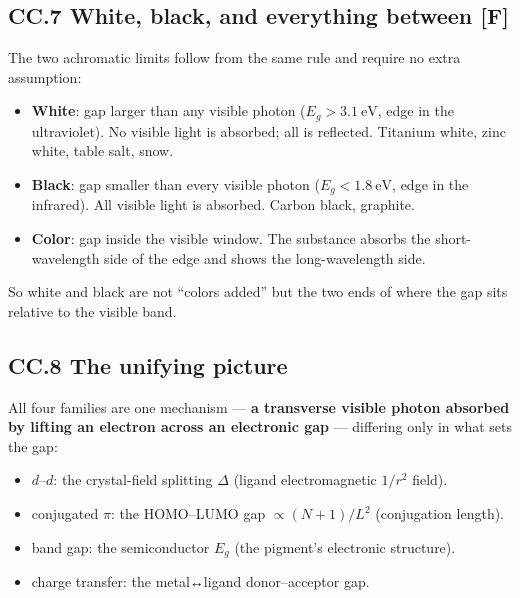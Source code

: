 \documentclass[
  10pt,
]{article}
\providecommand{\tightlist}{%
  \setlength{\itemsep}{0pt}\setlength{\parskip}{0pt}}
\begin{document}
\hypertarget{cc.7-white-black-and-everything-between-f}{%
\subsection{\texorpdfstring{CC.7 White, black, and everything between
\textbf{{[}F{]}}}{CC.7 White, black, and everything between {[}F{]}}}\label{cc.7-white-black-and-everything-between-f}}

The two achromatic limits follow from the same rule and require no extra
assumption:

\begin{itemize}
\tightlist
\item
  \textbf{White}: gap larger than any visible photon
  (\(E_g > 3.1\ \mathrm{eV}\), edge in the ultraviolet). No visible
  light is absorbed; all is reflected. Titanium white, zinc white, table
  salt, snow.
\item
  \textbf{Black}: gap smaller than every visible photon
  (\(E_g < 1.8\ \mathrm{eV}\), edge in the infrared). All visible light
  is absorbed. Carbon black, graphite.
\item
  \textbf{Color}: gap inside the visible window. The substance absorbs
  the short-wavelength side of the edge and shows the long-wavelength
  side.
\end{itemize}

So white and black are not ``colors added'' but the two ends of where
the gap sits relative to the visible band.

\hypertarget{cc.8-the-unifying-picture}{%
\subsection{CC.8 The unifying picture}\label{cc.8-the-unifying-picture}}

All four families are one mechanism --- \textbf{a transverse visible
photon absorbed by lifting an electron across an electronic gap} ---
differing only in what sets the gap:

\begin{itemize}
\tightlist
\item
  \(d\)--\(d\): the crystal-field splitting \(\Delta\) (ligand
  electromagnetic \(1/r^2\) field).
\item
  conjugated \(\pi\): the HOMO--LUMO gap \(\propto (N+1)/L^2\)
  (conjugation length).
\item
  band gap: the semiconductor \(E_g\) (the pigment's electronic
  structure).
\item
  charge transfer: the metal↔ligand donor--acceptor gap.
\end{itemize}
\end{document}
